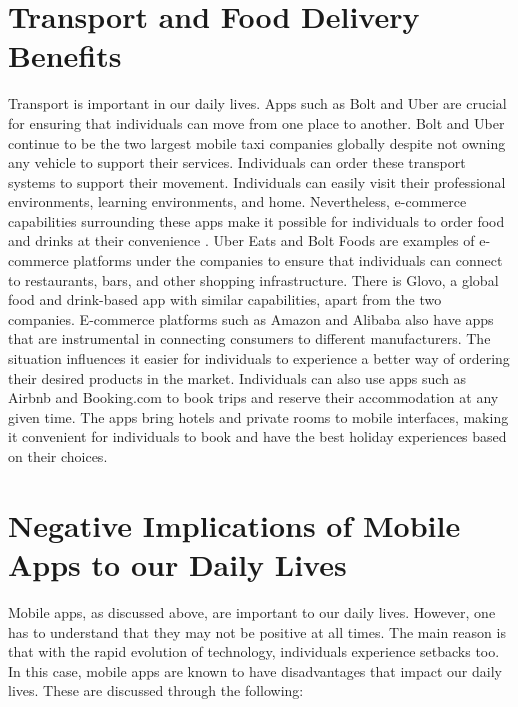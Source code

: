 \documentclass{article}
\begin{document}
\section*{Transport and Food Delivery Benefits}
Transport is important in our daily lives. Apps such as Bolt and Uber are crucial for ensuring that individuals can move from one place to another. Bolt and Uber continue to be the two largest mobile taxi companies globally despite not owning any vehicle to support their services. Individuals can order these transport systems to support their movement. Individuals can easily visit their professional environments, learning environments, and home. Nevertheless, e-commerce capabilities surrounding these apps make it possible for individuals to order food and drinks at their convenience \cite{gaber21}. Uber Eats and Bolt Foods are examples of e-commerce platforms under the companies to ensure that individuals can connect to restaurants, bars, and other shopping infrastructure. 
There is Glovo, a global food and drink-based app with similar capabilities, apart from the two companies. E-commerce platforms such as Amazon and Alibaba also have apps that are instrumental in connecting consumers to different manufacturers. The situation influences it easier for individuals to experience a better way of ordering their desired products in the market. Individuals can also use apps such as Airbnb and Booking.com to book trips and reserve their accommodation at any given time. The apps bring hotels and private rooms to mobile interfaces, making it convenient for individuals to book and have the best holiday experiences based on their choices. 

\medskip

\section*{Negative Implications of Mobile Apps to our Daily Lives}
Mobile apps, as discussed above, are important to our daily lives. However, one has to understand that they may not be positive at all times. The main reason is that with the rapid evolution of technology, individuals experience setbacks too. In this case, mobile apps are known to have disadvantages that impact our daily lives. These are discussed through the following:

\medskip
\end{document}
